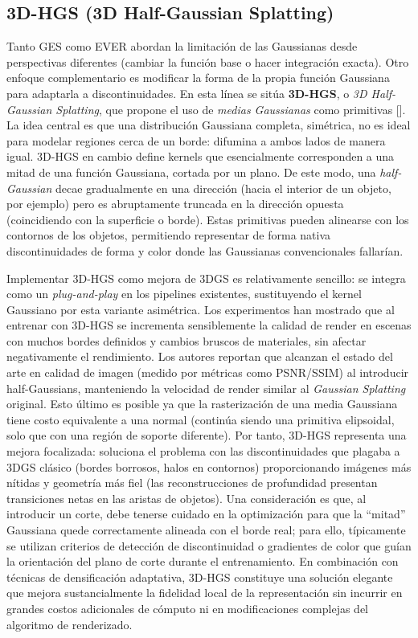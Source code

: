 \subsection{3D-HGS (3D Half-Gaussian Splatting)}

Tanto GES como EVER abordan la limitación de las Gaussianas desde perspectivas diferentes (cambiar la función base o hacer integración exacta). Otro enfoque complementario es modificar la forma de la propia función Gaussiana para adaptarla a discontinuidades. En esta línea se sitúa \textbf{3D-HGS}, o \textit{3D Half-Gaussian Splatting}, que propone el uso de \textit{medias Gaussianas} como primitivas [\cite{li20243d}]. La idea central es que una distribución Gaussiana completa, simétrica, no es ideal para modelar regiones cerca de un borde: difumina a ambos lados de manera igual. 3D-HGS en cambio define kernels que esencialmente corresponden a una mitad de una función Gaussiana, cortada por un plano. De este modo, una \textit{half-Gaussian} decae gradualmente en una dirección (hacia el interior de un objeto, por ejemplo) pero es abruptamente truncada en la dirección opuesta (coincidiendo con la superficie o borde). Estas primitivas pueden alinearse con los contornos de los objetos, permitiendo representar de forma nativa discontinuidades de forma y color donde las Gaussianas convencionales fallarían.

Implementar 3D-HGS como mejora de 3DGS es relativamente sencillo: se integra como un \textit{plug-and-play} en los pipelines existentes, sustituyendo el kernel Gaussiano por esta variante asimétrica. Los experimentos han mostrado que al entrenar con 3D-HGS se incrementa sensiblemente la calidad de render en escenas con muchos bordes definidos y cambios bruscos de materiales, sin afectar negativamente el rendimiento. Los autores reportan que alcanzan el estado del arte en calidad de imagen (medido por métricas como PSNR/SSIM) al introducir half-Gaussians, manteniendo la velocidad de render similar al \textit{Gaussian Splatting} original. Esto último es posible ya que la rasterización de una media Gaussiana tiene costo equivalente a una normal (continúa siendo una primitiva elipsoidal, solo que con una región de soporte diferente). Por tanto, 3D-HGS representa una mejora focalizada: soluciona el problema con las discontinuidades que plagaba a 3DGS clásico (bordes borrosos, halos en contornos) proporcionando imágenes más nítidas y geometría más fiel (las reconstrucciones de profundidad presentan transiciones netas en las aristas de objetos). Una consideración es que, al introducir un corte, debe tenerse cuidado en la optimización para que la “mitad” Gaussiana quede correctamente alineada con el borde real; para ello, típicamente se utilizan criterios de detección de discontinuidad o gradientes de color que guían la orientación del plano de corte durante el entrenamiento. En combinación con técnicas de densificación adaptativa, 3D-HGS constituye una solución elegante que mejora sustancialmente la fidelidad local de la representación sin incurrir en grandes costos adicionales de cómputo ni en modificaciones complejas del algoritmo de renderizado.

